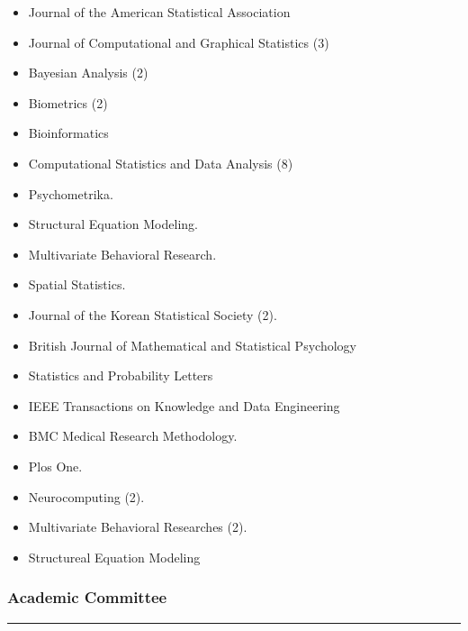 \documentclass[
]{book}
\providecommand{\tightlist}{%
  \setlength{\itemsep}{0pt}\setlength{\parskip}{0pt}}
\begin{document}
\begin{itemize}
\tightlist
\item
  Journal of the American Statistical Association
\item
  Journal of Computational and Graphical Statistics (3)
\item
  Bayesian Analysis (2)
\item
  Biometrics (2)
\item
  Bioinformatics
\item
  Computational Statistics and Data Analysis (8)
\item
  Psychometrika.
\item
  Structural Equation Modeling.
\item
  Multivariate Behavioral Research.
\item
  Spatial Statistics.
\item
  Journal of the Korean Statistical Society (2).
\item
  British Journal of Mathematical and Statistical Psychology
\item
  Statistics and Probability Letters
\item
  IEEE Transactions on Knowledge and Data Engineering
\item
  BMC Medical Research Methodology.
\item
  Plos One.
\item
  Neurocomputing (2).
\item
  Multivariate Behavioral Researches (2).
\item
  Structureal Equation Modeling
\end{itemize}

\hypertarget{academic-committee}{%
\subsubsection*{Academic Committee}\label{academic-committee}}

\begin{center}\rule{0.5\linewidth}{0.5pt}\end{center}
\end{document}

